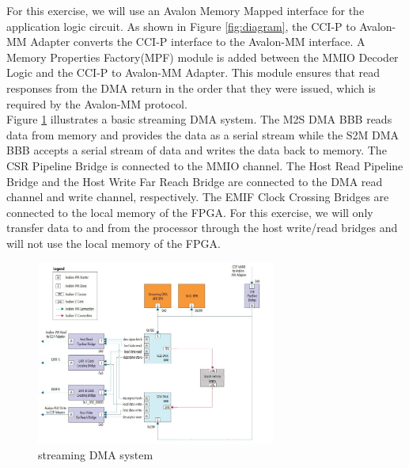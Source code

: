 \documentclass[epsfig,10pt,fullpage]{article}
\begin{document}
\noindent
For this exercise, we will use an Avalon Memory Mapped interface for the application logic circuit. As shown in Figure \ref{fig:diagram}, the CCI-P to Avalon-MM Adapter converts the CCI-P interface to the Avalon-MM interface. A Memory Properties Factory(MPF) module is added between the MMIO Decoder Logic and the CCI-P to Avalon-MM Adapter. This module ensures that read responses from the DMA return in the order that they were issued, which is required by the Avalon-MM protocol.\\


\noindent
Figure \ref{fig:qsys} illustrates a basic streaming DMA system. The M2S DMA BBB reads data from memory and provides the data as a serial stream while the S2M DMA BBB accepts a serial stream of data and writes the data back to memory. The CSR Pipeline Bridge is connected to the MMIO channel. The Host Read Pipeline Bridge and the Host Write Far Reach Bridge are connected to the DMA read channel and write channel, respectively. The EMIF Clock Crossing Bridges are connected to the local memory of the FPGA. For this exercise, we will only transfer data to and from the processor through the host write/read bridges and will not use the local memory of the FPGA.\\

\begin{figure}[h]
    \centering
    \includegraphics[width=0.7\textwidth]{figures/streaming_AFU.jpg}
    \caption{streaming DMA system}
    \label{fig:qsys}
\end{figure}
\end{document}
